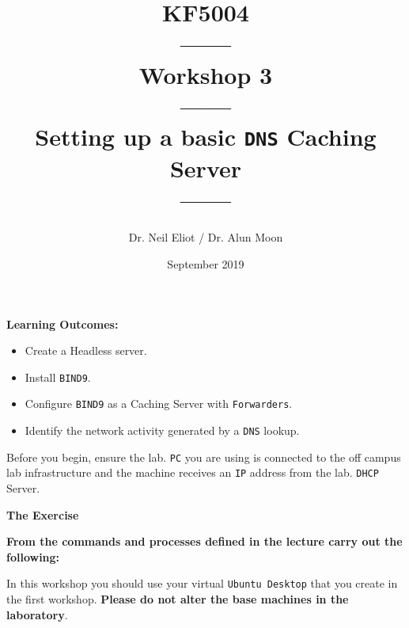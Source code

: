 \documentclass[11pt]{article}
\begin{document}
\author{Dr. Neil Eliot / Dr. Alun Moon}
\title{KF5004\\------\\Workshop 3\\------\\Setting up a basic \texttt{DNS} Caching Server\\------}
\date{September 2019}
\maketitle

\newpage



\noindent\textbf{Learning Outcomes:}
\begin{itemize}
    \item Create a Headless server.
    \item Install \texttt{BIND9}.
    \item Configure \texttt{BIND9} as a Caching Server with \texttt{Forwarders}.
    \item Identify the network activity generated by a \texttt{DNS} lookup.
\end{itemize}


\begin{tcolorbox}[title={\textbf{Important:}}]
    Before you begin, ensure the lab. \texttt{PC} you are using is connected to the off campus lab infrastructure and the machine receives an \texttt{IP} address from the lab. \texttt{DHCP} Server.
\end{tcolorbox}
\newpage

\noindent\textbf{The Exercise}\\
\begin{tcolorbox}[colback=blue!20]
    \noindent\textbf{From the commands and processes defined in the lecture carry out the following:}
\end{tcolorbox}


\begin{tcolorbox}[title={\textbf{NOTE:}}]
    In this workshop you should use your virtual \texttt{Ubuntu Desktop} that you create in the first workshop. \textbf{Please do not alter the base machines in the laboratory}.
\end{tcolorbox}
\end{document}
